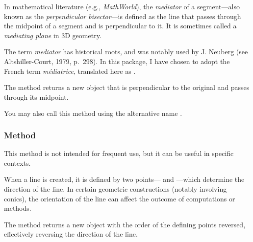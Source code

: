 In mathematical literature (e.g., \textit{MathWorld}), the \emph{mediator} of a segment—also known as the \emph{perpendicular bisector}—is defined as the line that passes through the midpoint of a segment and is perpendicular to it. It is sometimes called a \emph{mediating plane} in 3D geometry.

The term \emph{mediator} has historical roots, and was notably used by J. Neuberg (see Altshiller-Court, 1979, p.~298). In this package, I have chosen to adopt the French term \emph{médiatrice}, translated here as .

\medskip
\noindent
The method returns a new  object that is perpendicular to the original and passes through its midpoint.

\medskip
\noindent
{} You may also call this method using the alternative name .

\vspace{1em}
\begin{tkzexample}[latex=.5\textwidth]
\begin{center}
\end{center}
\end{tkzexample}

\subsubsection{Method }
\label{ssub:method_line_swap__line}

This method is not intended for frequent use, but it can be useful in specific contexts.

\medskip
\noindent
When a line is created, it is defined by two points— and —which determine the direction of the line. In certain geometric constructions (notably involving conics), the orientation of the line can affect the outcome of computations or methods.

\medskip
\noindent
The  method returns a new  object with the order of the defining points reversed, effectively reversing the direction of the line.

